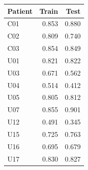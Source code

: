 \begin{tabular}{lrr}
\toprule
\textbf{Patient} & \textbf{Train} & \textbf{Test} \\
\midrule
C01 & 0.853 & 0.880 \\
C02 & 0.809 & 0.740 \\
C03 & 0.854 & 0.849 \\
U01 & 0.821 & 0.822 \\
U03 & 0.671 & 0.562 \\
U04 & 0.514 & 0.412 \\
U05 & 0.805 & 0.812 \\
U07 & 0.855 & 0.901 \\
U12 & 0.491 & 0.345 \\
U15 & 0.725 & 0.763 \\
U16 & 0.695 & 0.679 \\
U17 & 0.830 & 0.827 \\
\bottomrule
\end{tabular}
